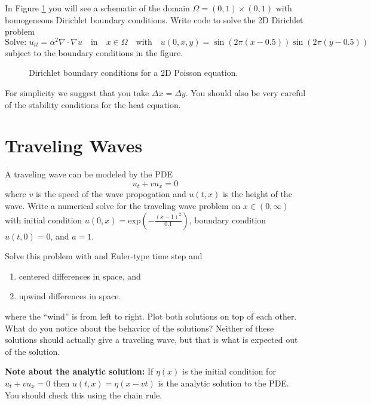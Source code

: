 \begin{problem}
    In Figure \ref{fig:2DWave_BC} you will see a schematic of the domain
    $\Omega=(0,1)\times (0,1)$ with homogeneous Dirichlet boundary conditions.  Write code
    to solve the 2D Dirichlet problem
    \[ \text{Solve: } u_{tt} = \alpha^2 \nabla \cdot \nabla u  \quad \text{in} \quad x \in \Omega \quad \text{with} \quad
    u(0,x,y) = \sin(2\pi (x-0.5))\sin(2\pi(y-0.5)) \]
    subject to the boundary conditions in the figure.

    \begin{figure}[ht!]
        \centering
        \caption{Dirichlet boundary conditions for a 2D Poisson equation.}
        \label{fig:2DWave_BC}
    \end{figure}
    For simplicity we suggest that you take $\Delta x = \Delta y$.  You should also be
    very careful of the stability conditions for the heat equation.  
\end{problem}


\newpage\section{Traveling Waves}

\begin{problem}
    A traveling wave can be modeled by the PDE
    \[ u_t + v u_x = 0 \]
    where $v$ is the speed of the wave propogation and $u(t,x)$ is the height of the wave.
    Write a numerical solve for the traveling wave problem on $x \in (0,\infty)$ with initial condition $u(0,x)
    = \text{exp}\left( -\frac{(x-1)^2}{0.1} \right)$, boundary condition $u(t,0) = 0$, and $a=1$.

    Solve this problem with and Euler-type time step and
    \begin{enumerate}
        \item centered differences in space, and
        \item upwind differences in space.
    \end{enumerate}
    where the ``wind'' is from left to right.  Plot both solutions on top of each
    other.  What do you notice about the behavior of the solutions?  Neither of these
    solutions should actually give a traveling wave, but that is what is
    expected out of the solution.  

    {\bf Note about the analytic solution:} If $\eta(x)$ is the initial condition for $u_t + v u_x = 0$ then
    $u(t,x) = \eta(x-vt)$ is the analytic solution to the PDE.  You should check this
    using the chain rule.
\end{problem}


